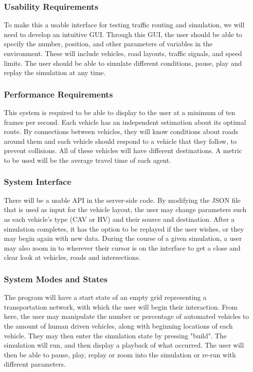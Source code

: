 \documentclass[onecolumn, draftclsnofoot,10pt, compsoc]{IEEEtran}
\begin{document}
\subsubsection{Usability Requirements}
To make this a usable interface for testing traffic routing and simulation, we will need to develop an intuitive GUI.
Through this GUI, the user should be able to specify the number, position, and other parameters of variables in the environment.
These will include vehicles, road layouts, traffic signals, and speed limits.
The user should be able to simulate different conditions, pause, play and replay the simulation at any time.
\subsubsection{Performance Requirements}
This system is required to be able to display to the user at a minimum of ten frames per second.
Each vehicle has an independent estimation about its optimal route.
By connections between vehicles, they will know conditions about roads around them and each vehicle should respond to a vehicle that they follow, to prevent collisions.
All of these vehicles will have different destinations.
A metric to be used will be the average travel time of each agent.
\subsubsection{System Interface}
There will be a usable API in the server-side code.
By modifying the JSON file that is used as input for the vehicle layout, the user may change parameters such as each vehicle's type (CAV or HV) and their source and destination.
After a simulation completes, it has the option to be replayed if the user wishes, or they may begin again with new data.
During the course of a given simulation, a user may also zoom in to wherever their cursor is on the interface to get a close and clear look at vehicles, roads and intersections.
\subsubsection{System Modes and States}
The program will have a start state of an empty grid representing a transportation network, with which the user will begin their interaction.
From here, the user may manipulate the number or percentage of automated vehicles to the amount of human driven vehicles, along with beginning locations of each vehicle.
They may then enter the simulation state by pressing "build".
The simulation will run, and then display a playback of what occurred.
The user will then be able to pause, play, replay or zoom into the simulation or re-run with different parameters.
\end{document}
